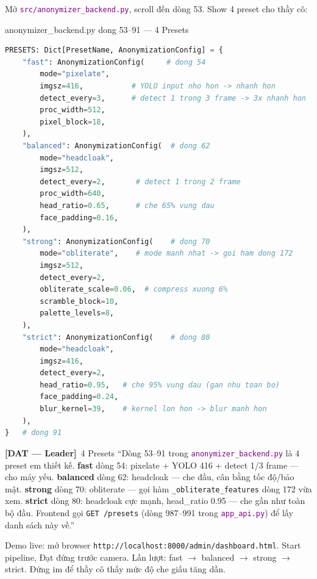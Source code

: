 \documentclass[12pt, a4paper]{article}
\newcommand{\dat}{\textcolor{BrickRed}{\textbf{[DAT --- Leader]}}}
\newcommand{\fpath}[1]{\texttt{\textcolor{purple}{#1}}}
\begin{document}
\begin{action}
Mở \fpath{src/anonymizer\_backend.py}, scroll đến dòng 53.
Show 4 preset cho thầy cô:
\end{action}

\begin{codestep}{anonymizer\_backend.py dong 53--91 --- 4 Presets}
\begin{lstlisting}[language=Python, firstnumber=53]
PRESETS: Dict[PresetName, AnonymizationConfig] = {
    "fast": AnonymizationConfig(     # dong 54
        mode="pixelate",
        imgsz=416,           # YOLO input nho hon -> nhanh hon
        detect_every=3,      # detect 1 trong 3 frame -> 3x nhanh hon
        proc_width=512,
        pixel_block=18,
    ),
    "balanced": AnonymizationConfig(  # dong 62
        mode="headcloak",
        imgsz=512,
        detect_every=2,       # detect 1 trong 2 frame
        proc_width=640,
        head_ratio=0.65,      # che 65% vung dau
        face_padding=0.16,
    ),
    "strong": AnonymizationConfig(    # dong 70
        mode="obliterate",    # mode manh nhat -> goi ham dong 172
        imgsz=512,
        detect_every=2,
        obliterate_scale=0.06,  # compress xuong 6%
        scramble_block=10,
        palette_levels=8,
    ),
    "strict": AnonymizationConfig(    # dong 80
        mode="headcloak",
        imgsz=416,
        detect_every=2,
        head_ratio=0.95,   # che 95% vung dau (gan nhu toan bo)
        face_padding=0.24,
        blur_kernel=39,    # kernel lon hon -> blur manh hon
    ),
}   # dong 91
\end{lstlisting}
\end{codestep}

\begin{dialog}{\dat\ 4 Presets}
``Dòng 53--91 trong \fpath{anonymizer\_backend.py} là 4 preset em thiết kế.
\textbf{fast} dòng 54: pixelate + YOLO 416 + detect 1/3 frame --- cho máy yếu.
\textbf{balanced} dòng 62: headcloak --- che đầu, cân bằng tốc độ/bảo mật.
\textbf{strong} dòng 70: obliterate --- gọi hàm \texttt{\_obliterate\_features} dòng 172 vừa xem.
\textbf{strict} dòng 80: headcloak cực mạnh, head\_ratio 0.95 --- che gần như toàn bộ đầu.
Frontend gọi \texttt{GET /presets} (dòng 987--991 trong \fpath{app\_api.py})
để lấy danh sách này về.''
\end{dialog}

\begin{action}
Demo live: mở browser \texttt{http://localhost:8000/admin/dashboard.html}.
Start pipeline, Đạt đứng trước camera.
Lần lượt: fast $\to$ balanced $\to$ strong $\to$ strict.
Đứng im để thầy cô thấy mức độ che giấu tăng dần.
\end{action}
\end{document}
